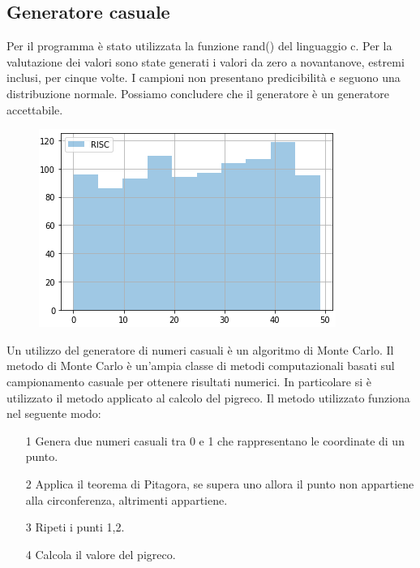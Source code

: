 \documentclass[12pt,a4paper]{report}
\begin{document}
\subsection{Generatore casuale}
Per il programma è stato utilizzata la funzione rand() del linguaggio c. Per la valutazione dei valori sono state generati i valori da zero a novantanove, estremi inclusi, per cinque volte. I campioni non presentano predicibilità e seguono una distribuzione normale. Possiamo concludere che il generatore è un generatore accettabile.
\begin{figure}
\centering
\includegraphics[scale=0.8]{Img/RngGrafico.png}
\end{figure}

Un utilizzo del generatore di numeri casuali è un algoritmo di Monte Carlo. Il metodo di Monte Carlo è un'ampia classe di metodi computazionali basati sul campionamento casuale per ottenere risultati numerici.  In particolare si è utilizzato il metodo applicato al calcolo del pigreco.
Il metodo utilizzato funziona nel seguente modo:
\begin{itemize}
	\item[1] Genera due numeri casuali tra 0 e 1 che rappresentano le coordinate di un punto.
	\item[2] Applica il teorema di Pitagora, se supera uno allora il punto non appartiene alla circonferenza, altrimenti appartiene.
	\item[3] Ripeti i punti 1,2.
	\item[4] Calcola il valore del pigreco.
\end{itemize}
\end{document}
